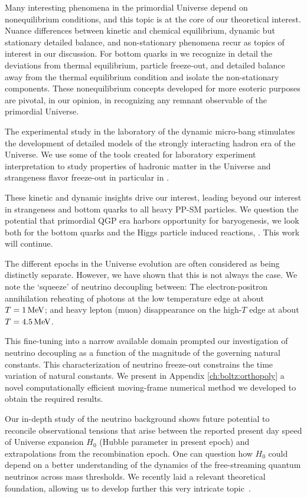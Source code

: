 Many interesting phenomena in the primordial Universe depend on nonequilibrium conditions, and this topic is at the core of our theoretical interest. Nuance differences between kinetic and chemical equilibrium, dynamic but stationary detailed balance, and non-stationary phenomena recur as topics of interest in our discussion. For bottom quarks in  we recognize in detail the deviations from thermal equilibrium, particle freeze-out, and detailed balance away from the thermal equilibrium condition and isolate the non-stationary components. These nonequilibrium concepts developed for more esoteric purposes are pivotal, in our opinion, in recognizing any remnant observable of the primordial Universe. 

The experimental study in the laboratory of the dynamic micro-bang stimulates the development of detailed models of the strongly interacting hadron era of the Universe. We use some of the tools created for laboratory experiment interpretation to study properties of hadronic matter in the Universe and strangeness flavor freeze-out in particular in . 

These kinetic and dynamic insights drive our interest, leading beyond our interest in strangeness and bottom quarks to all heavy PP-SM particles. We question the potential that primordial QGP era harbors opportunity for baryogenesis, we look both for the bottom quarks and the Higgs particle induced reactions, . This work will continue.

The different epochs in the Universe evolution are often considered as being distinctly separate. However, we have shown that this is not always the case. We note the `squeeze' of neutrino decoupling between: The electron-positron annihilation reheating of photons at the low temperature edge at about $T=1\text{\,MeV}$; and heavy lepton (muon) disappearance on the high-$T$ edge at about $T=4.5\text{\,MeV}$. 

This fine-tuning into a narrow available domain prompted our investigation of neutrino decoupling as a function of the magnitude of the governing natural constants. This characterization of neutrino freeze-out constrains the time variation of natural constants. We present in Appendix \ref{ch:boltz:orthopoly} a novel computationally efficient moving-frame numerical method we developed to obtain the required results.

Our in-depth study of the neutrino background shows future potential to reconcile observational tensions that arise between the reported present day speed of Universe expansion $H_0$ (Hubble parameter in present epoch) and extrapolations from the recombination epoch. One can question how $H_0$ could depend on a better understanding of the dynamics of the free-streaming quantum neutrinos across mass thresholds. We recently laid a relevant theoretical foundation, allowing us to develop further this very intricate topic~\cite{Birrell:2024bdb}.

